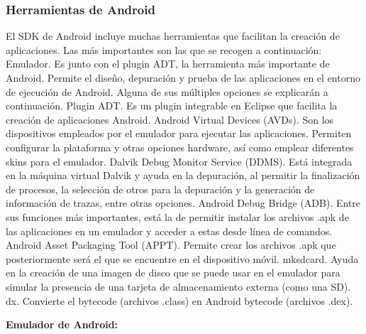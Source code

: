 \documentclass[12 pt, a4paper, twoside]{article}
\begin{document}
\subsubsection{Herramientas de Android}
El SDK de Android incluye muchas herramientas que facilitan la creación de
aplicaciones. Las más importantes son las que se recogen a continuación:
Emulador. Es junto con el plugin ADT, la herramienta más importante
de Android. Permite el diseño, depuración y prueba de las aplicaciones en
el entorno de ejecución de Android. Alguna de sus múltiples opciones se
explicarán a continuación.
Plugin ADT. Es un plugin integrable en Eclipse que facilita la creación de
aplicaciones Android.
Android Virtual Devices (AVDs). Son los dispositivos empleados por el
emulador para ejecutar las aplicaciones. Permiten configurar la plataforma y
otras opciones hardware, así como emplear diferentes skins para el emulador.
Dalvik Debug Monitor Service (DDMS). Está integrada en la máquina virtual
Dalvik y ayuda en la depuración, al permitir la finalización de procesos,
la selección de otros para la depuración y la generación de información de
trazas, entre otras opciones.
Android Debug Bridge (ADB). Entre sus funciones más importantes, está
la de permitir instalar los archivos .apk de las aplicaciones en un emulador y
acceder a estas desde línea de comandos.
Android Asset Packaging Tool (APPT). Permite crear los archivos .apk
que posteriormente será el que se encuentre en el dispositivo móvil.
mksdcard. Ayuda en la creación de una imagen de disco que se puede usar
en el emulador para simular la presencia de una tarjeta de almacenamiento
externa (como una SD).
dx. Convierte el bytecode (archivos .class) en Android bytecode (archivos
.dex).

\textbf{Emulador de Android:}
\end{document}
